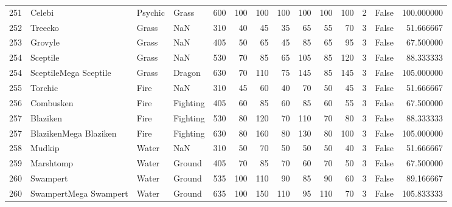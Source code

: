 \begin{tabular}{rlllrrrrrrrrlr}
 251 &                     Celebi &   Psychic &     Grass &    600 &  100 &     100 &      100 &      100 &      100 &    100 &           2 &      False &  100.000000 \\
 252 &                    Treecko &     Grass &       NaN &    310 &   40 &      45 &       35 &       65 &       55 &     70 &           3 &      False &   51.666667 \\
 253 &                    Grovyle &     Grass &       NaN &    405 &   50 &      65 &       45 &       85 &       65 &     95 &           3 &      False &   67.500000 \\
 254 &                   Sceptile &     Grass &       NaN &    530 &   70 &      85 &       65 &      105 &       85 &    120 &           3 &      False &   88.333333 \\
 254 &      SceptileMega Sceptile &     Grass &    Dragon &    630 &   70 &     110 &       75 &      145 &       85 &    145 &           3 &      False &  105.000000 \\
 255 &                    Torchic &      Fire &       NaN &    310 &   45 &      60 &       40 &       70 &       50 &     45 &           3 &      False &   51.666667 \\
 256 &                  Combusken &      Fire &  Fighting &    405 &   60 &      85 &       60 &       85 &       60 &     55 &           3 &      False &   67.500000 \\
 257 &                   Blaziken &      Fire &  Fighting &    530 &   80 &     120 &       70 &      110 &       70 &     80 &           3 &      False &   88.333333 \\
 257 &      BlazikenMega Blaziken &      Fire &  Fighting &    630 &   80 &     160 &       80 &      130 &       80 &    100 &           3 &      False &  105.000000 \\
 258 &                     Mudkip &     Water &       NaN &    310 &   50 &      70 &       50 &       50 &       50 &     40 &           3 &      False &   51.666667 \\
 259 &                  Marshtomp &     Water &    Ground &    405 &   70 &      85 &       70 &       60 &       70 &     50 &           3 &      False &   67.500000 \\
 260 &                   Swampert &     Water &    Ground &    535 &  100 &     110 &       90 &       85 &       90 &     60 &           3 &      False &   89.166667 \\
 260 &      SwampertMega Swampert &     Water &    Ground &    635 &  100 &     150 &      110 &       95 &      110 &     70 &           3 &      False &  105.833333 \\

\end{tabular}
